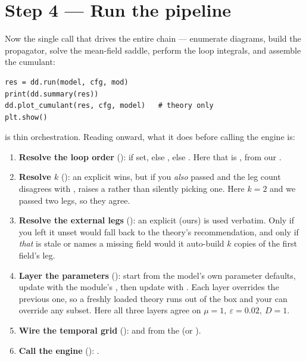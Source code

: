\section{Step 4 --- Run the pipeline}

Now the single call that drives the entire \msrjd{} chain --- enumerate
diagrams, build the propagator, solve the mean-field saddle, perform the loop
integrals, and assemble the cumulant:

\begin{lstlisting}
res = dd.run(model, cfg, mod)
print(dd.summary(res))
dd.plot_cumulant(res, cfg, model)   # theory only
plt.show()
\end{lstlisting}

 is thin orchestration. Reading
 onward, what it does before calling the engine
is:

\begin{enumerate}
  \item \textbf{Resolve the loop order} ():
         if set, else , else
        . Here that is , from our .
  \item \textbf{Resolve $k$} (): an explicit
         wins, but if you \emph{also} passed 
        and the leg count disagrees with ,  raises a
         rather than silently picking one. Here $k=2$ and we
        passed two legs, so they agree.
  \item \textbf{Resolve the external legs} ():
        an explicit  (ours) is used verbatim. Only if you
        left it unset would  fall back to the theory's recommendation,
        and only if \emph{that} is stale or names a missing field would it
        auto-build $k$ copies of the first field's leg.
  \item \textbf{Layer the parameters} (): start
        from the model's own parameter defaults, update with the module's
        , then update with . Each
        layer overrides the previous one, so a freshly loaded theory runs out of
        the box and your  can override any subset. Here all three
        layers agree on $\mu=1,\ \varepsilon=0.02,\ D=1$.
  \item \textbf{Wire the temporal grid} ():
         and  from the  (or
        ).
  \item \textbf{Call the engine} ():
        .
\end{enumerate}


